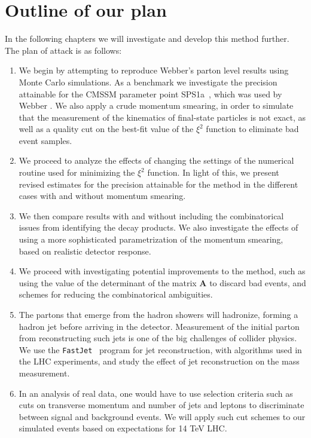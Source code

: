\documentclass[twoside,english]{uiofysmaster}
\begin{document}
\section{Outline of our plan}
In the following chapters we will investigate and develop this method further. The plan of attack is as follows:
\begin{enumerate}
  \item We begin by attempting to reproduce Webber's parton level results using Monte Carlo simulations. As a benchmark we investigate the precision attainable for the CMSSM parameter point SPS1a~\cite{Allanach:2002nj}, which was used by Webber \cite{Webber:2009vm}. We also apply a crude momentum smearing, in order to simulate that the measurement of the kinematics of final-state particles is not exact, as well as a quality cut on the best-fit value of the $\xi^2$ function to eliminate bad event samples.
  \item We proceed to analyze the effects of changing the settings of the numerical routine used for minimizing the $\xi^2$ function. In light of this, we present revised estimates for the precision attainable for the method in the different cases with and without momentum smearing.
  \item We then compare results with and without including the combinatorical issues from identifying the decay products. We also investigate the effects of using a more sophisticated parametrization of the momentum smearing, based on realistic detector response.
  \item We proceed with investigating potential improvements to the method, such as using the value of the determinant of the matrix $\mathbf A$ to discard bad events, and schemes for reducing the combinatorical ambiguities.
  \item The partons that emerge from the hadron showers will hadronize, forming a hadron jet before arriving in the detector. Measurement of the initial parton from reconstructing such jets is one of the big challenges of collider physics. We use the {\tt FastJet}~\cite{Cacciari:2011ma} program for jet reconstruction, with algorithms used in the LHC experiments, and study the effect of jet reconstruction on the mass measurement.
  \item In an analysis of real data, one would have to use selection criteria such as cuts on transverse momentum and number of jets and leptons to discriminate between signal and background events. We will apply such cut schemes to our simulated events based on expectations for 14 TeV LHC. 
\end{enumerate}
\end{document}
